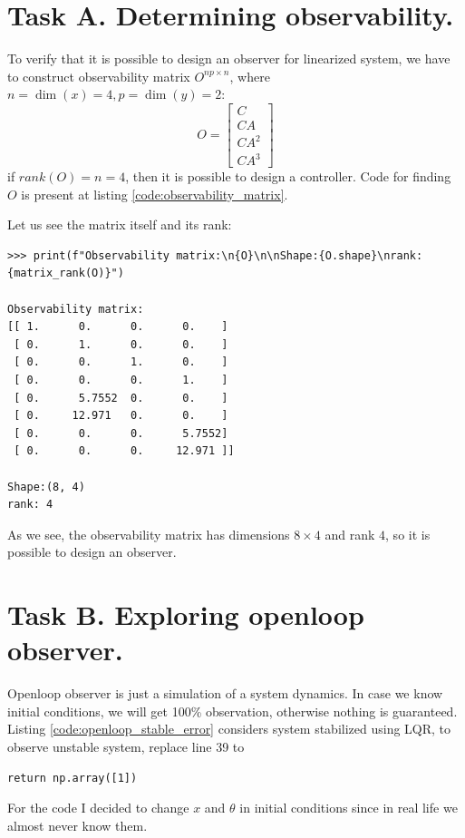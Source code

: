 \documentclass[12pt,letterpaper]{article}
\begin{document}
\section*{Task A. Determining observability.}
\label{Q:A}
    To verify that it is possible to design an observer for linearized system, we have to construct observability matrix $O^{np \times n}$, where $n=\dim(x)=4, p=\dim(y)=2$:
    \begin{equation*}
        O =
            \begin{bmatrix}
            C       \\
            CA      \\
            CA^2    \\
            CA^3
            \end{bmatrix}
    \end{equation*}
    if $rank(O) = n = 4$, then it is possible to design a controller. Code for finding $O$ is present at listing \ref{code:observability_matrix}.
     
    
     
    Let us see the matrix itself and its rank:
    \begin{verbatim}
>>> print(f"Observability matrix:\n{O}\n\nShape:{O.shape}\nrank: {matrix_rank(O)}")

Observability matrix:
[[ 1.      0.      0.      0.    ]
 [ 0.      1.      0.      0.    ]
 [ 0.      0.      1.      0.    ]
 [ 0.      0.      0.      1.    ]
 [ 0.      5.7552  0.      0.    ]
 [ 0.     12.971   0.      0.    ]
 [ 0.      0.      0.      5.7552]
 [ 0.      0.      0.     12.971 ]]

Shape:(8, 4)
rank: 4
    \end{verbatim}
    
    As we see, the observability matrix has dimensions $8 \times 4$ and rank $4$, so it is possible to design an observer.

\section*{Task B. Exploring openloop observer.}
\label{Q:B}
    Openloop observer is just a simulation of a system dynamics. In case we know initial conditions, we will get 100\% observation, otherwise nothing is guaranteed. Listing \ref{code:openloop_stable_error} considers system stabilized using LQR, to observe unstable system, replace line 39 to 
    \begin{verbatim}return np.array([1])\end{verbatim}
    For the code I decided to change $x$ and $\theta$ in initial conditions since in real life we almost never know them.
    
\end{document}
